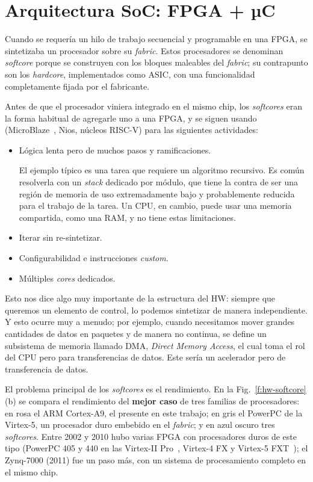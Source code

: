 \section{Arquitectura SoC: FPGA + µC}
\label{S:hw-soc}

Cuando se requería un hilo de trabajo secuencial y programable en una FPGA, se
sintetizaba un procesador sobre su \emph{fabric}. Estos procesadores se denominan
\emph{softcore} porque se construyen con los bloques maleables del \emph{fabric}; su
contrapunto son los \emph{hardcore}, implementados como ASIC, con una
funcionalidad completamente fijada por el fabricante.

Antes de que el procesador viniera integrado en el mismo chip, los \emph{softcores}
eran la forma habitual de agregarle uno a una FPGA, y se siguen usando
(MicroBlaze~\cite{UG984}, Nios, núcleos RISC-V) para las siguientes actividades:
\begin{itemize}
  \item Lógica lenta pero de muchos pasos y ramificaciones.

    El ejemplo típico es una tarea que requiere un algoritmo recursivo. Es
    común resolverla con un \emph{stack} dedicado por módulo, que tiene la
    contra de ser una región de memoria de uso extremadamente bajo y
    probablemente reducida para el trabajo de la tarea. Un CPU, en cambio,
    puede usar una memoria compartida, como una RAM, y no tiene estas
    limitaciones.
  \item Iterar sin re-sintetizar.
  \item Configurabilidad e instrucciones \emph{custom}.
  \item Múltiples \emph{cores} dedicados.
\end{itemize}

Esto nos dice algo muy importante de la estructura del HW: siempre que queremos
un elemento de control, lo podemos sintetizar de manera independiente. Y esto
ocurre muy a menudo; por ejemplo, cuando necesitamos mover grandes cantidades de
datos en paquetes y de manera no continua, se define un subsistema de memoria
llamado DMA, \emph{Direct Memory Access}, el cual toma el rol del CPU pero para
transferencias de datos. Este sería un acelerador pero de transferencia de
datos.

El problema principal de los \emph{softcores} es el rendimiento. En la
Fig.~\ref{f:hw-softcore}(b) se compara el rendimiento del \textbf{mejor caso} de
tres familias de procesadores: en rosa el ARM Cortex-A9, el presente en este
trabajo; en gris el PowerPC de la Virtex-5, un procesador duro embebido en el
\emph{fabric}; y en azul oscuro tres \emph{softcores}. Entre 2002 y 2010 hubo varias FPGA con
procesadores duros de este tipo (PowerPC 405 y 440 en las Virtex-II
Pro~\cite{DS083}, Virtex-4 FX y Virtex-5 FXT~\cite{UG200}); el Zynq-7000 (2011)
fue un paso más, con un sistema de procesamiento completo en el mismo chip.

